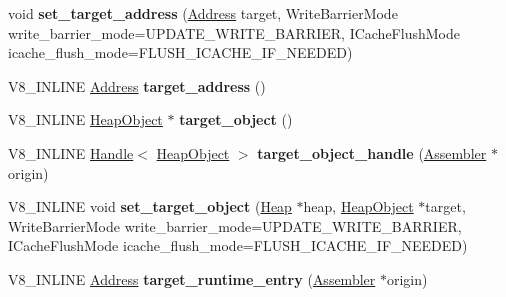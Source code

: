 \begin{DoxyCompactItemize}
\item 
\mbox{\label{classv8_1_1internal_1_1RelocInfo_a37946d7dda0621c92ed0a09bd556843f}} 
void {\bfseries set\+\_\+target\+\_\+address} (\mbox{\hyperlink{classuintptr__t}{Address}} target, Write\+Barrier\+Mode write\+\_\+barrier\+\_\+mode=U\+P\+D\+A\+T\+E\+\_\+\+W\+R\+I\+T\+E\+\_\+\+B\+A\+R\+R\+I\+ER, I\+Cache\+Flush\+Mode icache\+\_\+flush\+\_\+mode=F\+L\+U\+S\+H\+\_\+\+I\+C\+A\+C\+H\+E\+\_\+\+I\+F\+\_\+\+N\+E\+E\+D\+ED)
\item 
\mbox{\label{classv8_1_1internal_1_1RelocInfo_a5105ad25a3cfafd733106928a9d8a4ad}} 
V8\+\_\+\+I\+N\+L\+I\+NE \mbox{\hyperlink{classuintptr__t}{Address}} {\bfseries target\+\_\+address} ()
\item 
\mbox{\label{classv8_1_1internal_1_1RelocInfo_ad80bf75f1f04208415ef28558fe617d3}} 
V8\+\_\+\+I\+N\+L\+I\+NE \mbox{\hyperlink{classv8_1_1internal_1_1HeapObject}{Heap\+Object}} $\ast$ {\bfseries target\+\_\+object} ()
\item 
\mbox{\label{classv8_1_1internal_1_1RelocInfo_a1e5e13bc0017ec05d0e8320b7023b3b2}} 
V8\+\_\+\+I\+N\+L\+I\+NE \mbox{\hyperlink{classv8_1_1internal_1_1Handle}{Handle}}$<$ \mbox{\hyperlink{classv8_1_1internal_1_1HeapObject}{Heap\+Object}} $>$ {\bfseries target\+\_\+object\+\_\+handle} (\mbox{\hyperlink{classv8_1_1internal_1_1Assembler}{Assembler}} $\ast$origin)
\item 
\mbox{\label{classv8_1_1internal_1_1RelocInfo_a7f492b2b52f6b3c359fec43a0c154b0b}} 
V8\+\_\+\+I\+N\+L\+I\+NE void {\bfseries set\+\_\+target\+\_\+object} (\mbox{\hyperlink{classv8_1_1internal_1_1Heap}{Heap}} $\ast$heap, \mbox{\hyperlink{classv8_1_1internal_1_1HeapObject}{Heap\+Object}} $\ast$target, Write\+Barrier\+Mode write\+\_\+barrier\+\_\+mode=U\+P\+D\+A\+T\+E\+\_\+\+W\+R\+I\+T\+E\+\_\+\+B\+A\+R\+R\+I\+ER, I\+Cache\+Flush\+Mode icache\+\_\+flush\+\_\+mode=F\+L\+U\+S\+H\+\_\+\+I\+C\+A\+C\+H\+E\+\_\+\+I\+F\+\_\+\+N\+E\+E\+D\+ED)
\item 
\mbox{\label{classv8_1_1internal_1_1RelocInfo_a0d17b16373425a2732df5c3fe6a00772}} 
V8\+\_\+\+I\+N\+L\+I\+NE \mbox{\hyperlink{classuintptr__t}{Address}} {\bfseries target\+\_\+runtime\+\_\+entry} (\mbox{\hyperlink{classv8_1_1internal_1_1Assembler}{Assembler}} $\ast$origin)

\end{DoxyCompactItemize}
